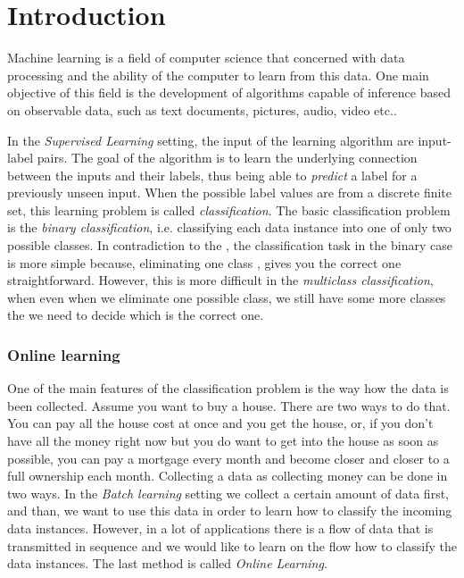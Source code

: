 \chapter{Introduction}



Machine learning is a  field of computer science that concerned with data processing and the ability
of the computer to learn from this data. 
One main objective of this field is the development of algorithms capable of inference based on 
observable data, such as text documents, pictures, audio, video etc.. 
 
In the \textit{Supervised Learning} setting, the input of the learning algorithm are input-label pairs. 
The goal of the algorithm is to learn the underlying connection between the inputs and their labels, 
thus being able to \textit{predict} a label for a previously unseen input. 
When the possible label values are from a discrete finite set, this learning problem is called
 \textit{classification}. The basic classification problem is the \textit{binary classification}, i.e. classifying 
 each data instance into one of only two possible classes. In contradiction to 
 the , the classification task in the binary 
 case is more simple because, eliminating one class , gives you the correct one 
 straightforward. However, this is more difficult in the \textit{multiclass 
 classification}, when even when we eliminate one possible class, we still have 
 some more classes the we need to decide which is the correct one. 
 

\subsection{Online learning}

One of the main features of the classification problem is the way how the data is been collected. 
Assume you want to buy a house. There are two ways to do that. 
You can pay all the house cost at once and you get the house, or, 
if you don't have all the money right now but you do want to get into the house as soon as possible, 
 you can pay a mortgage every month and become closer and closer to a full ownership each month. 
 Collecting a data as  collecting money can be done in two ways. 
 In the \textit{Batch learning} setting we collect a certain amount of data first, and  than, 
 we want to use this data in order to learn how to classify the incoming data instances. 
 However, in a lot of applications there is a flow of data that is transmitted in sequence  
 and we would like to learn on the flow how to classify the data instances. 
 The last method is called \textit{Online Learning}.

